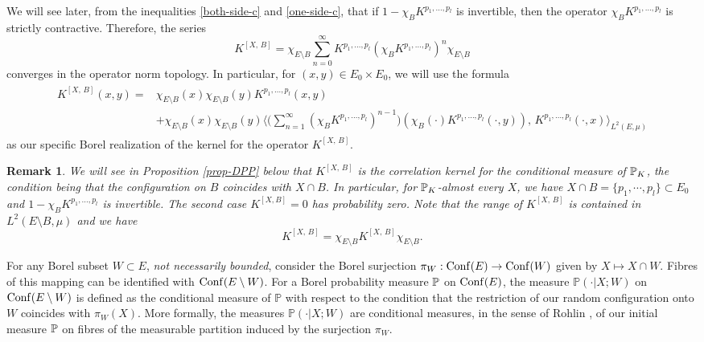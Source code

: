 \documentclass[12pt]{paper}
\newtheorem*{remark*}{Remark}
\numberwithin{theorem}{section}
\numberwithin{figure}{section}
\numberwithin{equation}{section}
\begin{document}
We will see later, from the inequalities \eqref{both-side-c} and \eqref{one-side-c},  that if $1-\chi_B K^{p_1, \dots, p_l}$ is invertible, then the operator $\chi_B K^{p_1, \dots, p_l}$ is strictly contractive. Therefore, the series
\[
K^{[X,\, B]} = \chi_{E\setminus B}  \sum_{n=0}^\infty K^{p_1, \dots, p_l}(\chi_B K^{p_1, \dots, p_l})^{n}\chi_{E\setminus B}
\]
converges in the operator norm topology. In particular, for $(x, y) \in E_0 \times E_0$, we will use the formula
\begin{align}\label{canonical-KXB}
\begin{split}
K^{[X,\, B]}(x, y) =& \chi_{E\setminus B} (x) \chi_{E\setminus B} (y)  K^{p_1, \dots, p_l}(x, y)
\\
& + \chi_{E\setminus B} (x) \chi_{E\setminus B} (y)  \Big \langle     \Big( \sum_{n=1}^\infty  (\chi_B  K^{p_1, \dots, p_l})^{n-1}  \Big)  (\chi_B(\cdot) K^{p_1, \dots, p_l}(\cdot, y)),\, K^{p_1, \dots, p_l}(\cdot, x)  \Big \rangle_{L^2(E, \mu)}
\end{split}
\end{align}
as our specific Borel realization of the kernel  for the operator $K^{[X, \, B]}$.


\begin{remark*}
We will see in Proposition \ref{prop-DPP} below that $K^{[X, \, B]}$ is the correlation kernel for the conditional measure of $\mathbb{P}_K$, the condition being that the configuration  on $B$ coincides with $X\cap B$. In particular, for $\mathbb{P}_K$-almost every $X$, we have $X \cap B = \{p_1, \cdots, p_l\} \subset E_0$ and $1-\chi_B K^{p_1, \dots, p_l}$ is invertible. The second case $K^{[X, B]} =0$ has probability zero.  Note that the range of $K^{[X, \, B]}$ is contained in $L^2(E \setminus B, \mu)$ and we have
\[
K^{[X, \, B]} = \chi_{E\setminus B} K^{[X, \, B]} \chi_{E\setminus B}.
\]
\end{remark*}





 For any Borel subset $W\subset E$, {\it not necessarily bounded},  consider the Borel surjection $\pi_W: \mathrm{Conf}(E) \rightarrow \mathrm{Conf}(W)$ given by $X \mapsto X \cap W$. Fibres of this mapping can be identified with $\mathrm{Conf}(E\setminus W)$.  For  a  Borel probability measure $\mathbb{P}$ on $\mathrm{Conf}(E)$,  the measure $\mathbb{P}(\cdot | X; W)$ on $\mathrm{Conf}(E\setminus W)$ is defined as the conditional measure of $\mathbb{P}$ with respect to the condition that the restriction of our random configuration onto $W$ coincides with $\pi_W(X)$. More formally,  the measures $\mathbb{P}(\cdot | X; W)$ are conditional measures, in the sense of Rohlin \cite{Rohlin-meas-eng},  of our initial measure $\mathbb{P}$ on fibres of the measurable partition induced by the surjection $\pi_W$.
\end{document}

